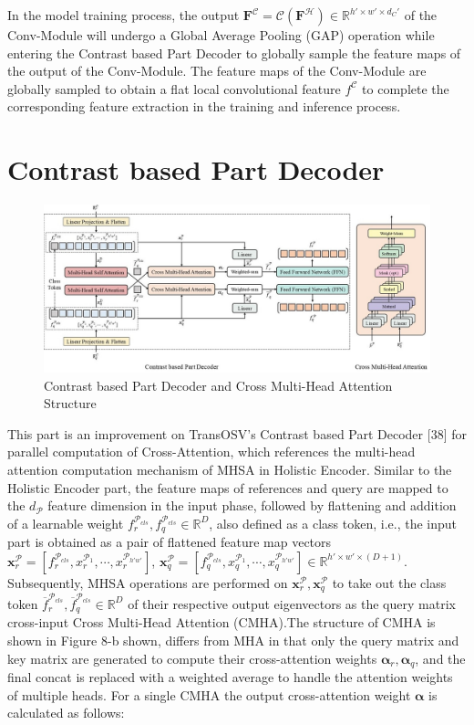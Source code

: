 In the model training process, the output $\mathbf{F}^\mathcal{C} = \mathcal{C}(\mathbf{F}^\mathcal{H} ) \in \mathbb{R}^{h'\times w'\times d_C' }$ of the Conv-Module will undergo a Global Average Pooling (GAP) operation while entering the Contrast based Part Decoder to globally sample the feature maps of the output of the Conv-Module. The feature maps of the Conv-Module are globally sampled to obtain a flat local convolutional feature $f^\mathcal{C}$ to complete the corresponding feature extraction in the training and inference process.

\section{Contrast based Part Decoder}

\begin{figure}[H]
  \centering
      \includegraphics[scale=0.45]{figure/decoder.jpg}
  \caption{Contrast based Part Decoder and Cross Multi-Head Attention Structure}
  \label{fig:decoder}
\end{figure}

This part is an improvement on TransOSV's Contrast based Part Decoder [38] for parallel computation of Cross-Attention, which references the multi-head attention computation mechanism of MHSA in Holistic Encoder. Similar to the Holistic Encoder part, the feature maps of references and query are mapped to the $d_\mathcal{P}$ feature dimension in the input phase, followed by flattening and addition of a learnable weight $f_r^{\mathcal{P}_{cls}},f_q^{\mathcal{P}_{cls}} \in \mathbb{R}^D$, also defined as a class token, i.e., the input part is obtained as a pair of flattened feature map vectors $\boldsymbol{x}_r^\mathcal{P} = [f_r^{\mathcal{P}_{cls}}, x_r^{\mathcal{P}_1},\cdots ,x_r^{\mathcal{P}_{h' w' }} ]$, $\boldsymbol{x}_q^\mathcal{P}=[f_q^{\mathcal{P}_{cls}},x_q^{\mathcal{P}_1},\cdots,x_q^{\mathcal{P}_{h'w'} } ] \in \mathbb{R}^{h' \times w' \times (D+1)}$. Subsequently, MHSA operations are performed on $\boldsymbol{x}_r^\mathcal{P},\boldsymbol{x}_q^\mathcal{P}$ to take out the class token $\overline{f}_r^{\mathcal{P}_{cls}},\overline{f}_q^{\mathcal{P}_{cls}} \in \mathbb{R}^D$ of their respective output eigenvectors as the query matrix cross-input Cross Multi-Head Attention (CMHA).The structure of CMHA is shown in Figure 8-b shown, differs from MHA in that only the query matrix and key matrix are generated to compute their cross-attention weights $\boldsymbol{\alpha}_r,\boldsymbol{\alpha}_q$, and the final concat is replaced with a weighted average to handle the attention weights of multiple heads. For a single CMHA the output cross-attention weight $\boldsymbol{\alpha}$ is calculated as follows:

